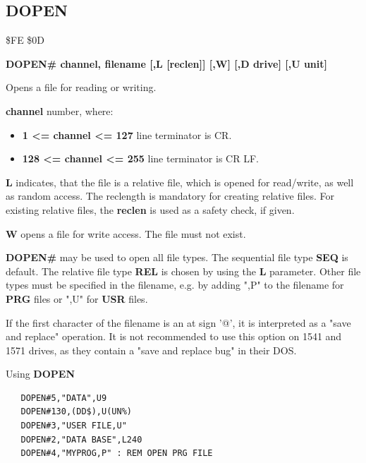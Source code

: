 \subsection{DOPEN}
\begin{description}[leftmargin=2cm,style=nextline]
\item [Token:] \$FE \$0D
\item [Format:]
  {\bf DOPEN\# channel, filename [,L [reclen]] [,W] [,D drive] [,U unit] }
\item [Usage:]
    Opens a file for reading or writing.

    {\bf channel} number, where:
    \begin{itemize}
        \item {\bf 1 <= channel <= 127} line terminator is CR.
        \item {\bf 128 <= channel <= 255} line terminator is CR LF.
    \end{itemize}

   {\bf L} indicates, that the file is a relative file, which
   is opened for read/write, as well as random access. The reclength
   is mandatory for creating relative files. For existing
   relative files, the {\bf reclen} is used as a safety check, if given.

   {\bf W} opens a file for write access. The file must not exist.

   \filenamedefinition

   \drivedefinition

   \unitdefinition

\item [Remarks:]
   {\bf DOPEN\#} may be used to open all file types.
   The sequential file type {\bf SEQ} is default.
   The relative file type {\bf REL} is chosen by using the
   {\bf L} parameter.  Other file types
   must be specified in the filename, e.g. by adding ",P" to the
   filename for {\bf PRG} files or ",U" for {\bf USR} files.

   If the first character of the filename is an at sign '@', it
   is interpreted as a "save and replace" operation. It is not recommended
   to use this option on 1541 and 1571 drives, as they
   contain a "save and replace bug" in their DOS.

\newpage
\item [Examples:] Using {\bf DOPEN}

\begin{tcolorbox}[colback=black,coltext=white]
\verbatimfont{\codefont}
\begin{verbatim}
   DOPEN#5,"DATA",U9
   DOPEN#130,(DD$),U(UN%)
   DOPEN#3,"USER FILE,U"
   DOPEN#2,"DATA BASE",L240
   DOPEN#4,"MYPROG,P" : REM OPEN PRG FILE
\end{verbatim}
\end{tcolorbox}
\end{description}

